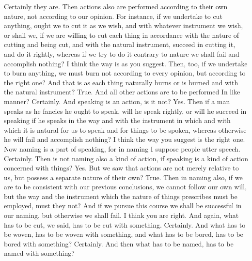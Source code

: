 \hermogenesspeaks
Certainly they are. 
\socratesspeaks
Then actions also are performed according to their own nature, not according to our opinion. For instance, if we undertake to cut anything, ought we to cut it as we wish, and with whatever instrument we wish, or shall we, if we are willing to cut each thing in accordance with the nature of cutting and being cut, and with the natural instrument, succeed in cutting it, and do it rightly, whereas if we try to do it contrary to nature we shall fail and accomplish nothing? 
\hermogenesspeaks
I think the way is as you suggest.
\socratesspeaks
Then, too, if we undertake to burn anything, we must burn not according to every opinion, but according to the right one? And that is as each thing naturally burns or is burned and with the natural instrument?
\hermogenesspeaks
True.
\socratesspeaks
And all other actions are to be performed In like manner?
\hermogenesspeaks
Certainly.
\socratesspeaks
And speaking is an action, is it not?
\hermogenesspeaks
Yes.
\socratesspeaks
Then if a man speaks as he fancies he ought to speak,  will he speak rightly, or will he succeed in speaking if he speaks in the way and with the instrument in which and with which it is natural for us to speak and for things to be spoken, whereas otherwise he will fail and accomplish nothing?
\hermogenesspeaks
I think the way you suggest is the right one.
\socratesspeaks
Now naming is a part of speaking, for in naming I suppose people utter speech.
\hermogenesspeaks
Certainly.
\socratesspeaks
Then is not naming also a kind of action, if speaking is a kind of action concerned with things?
\hermogenesspeaks
Yes. 
\socratesspeaks
But we saw that actions are not merely relative to us, but possess a separate nature of their own?
\hermogenesspeaks
True.
\socratesspeaks
Then in naming also, if we are to be consistent with our previous conclusions, we cannot follow our own will, but the way and the instrument which the nature of things prescribes must be employed, must they not? And if we pursue this course we shall be successful in our naming, but otherwise we shall fail.
\hermogenesspeaks
I think you are right.
\socratesspeaks
And again, what has to be cut, we said, has to be cut with something.
\hermogenesspeaks
Certainly. 
\socratesspeaks
And what has to be woven, has to be woven with something, and what has to be bored, has to be bored with something?
\hermogenesspeaks
Certainly.
\socratesspeaks
And then what has to be named, has to be named with something? 
\hermogenesspeaks
